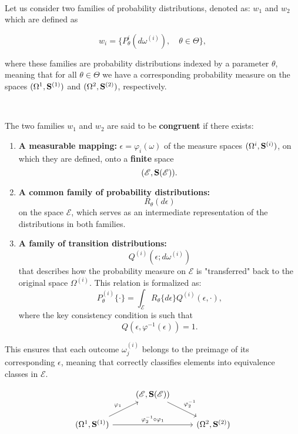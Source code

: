 \, 
\begin{theorem}\label{T:Univ}
Let us consider two families of probability distributions, denoted as: $ w_1$ and $w_2$ which are defined as

\[w_i=\{P_{\theta}^{{i}}(d\omega^{(i)}), \quad \theta\in \Theta\},\] 

where these families are probability distributions indexed by a parameter $\theta$, meaning that for all $\theta\in \Theta$ we have a corresponding probability measure on the spaces $(\Omega^{1},{\bf S}^{(1)})$ and $(\Omega^{2},{\bf S}^{(2)})$, respectively.

\, 

The two families $w_1$ and $w_2$ are said to be {\bf congruent} if there exists:

\begin{enumerate}
    \item {\bf A measurable mapping:}
$\epsilon=\varphi_{i}(\omega)$ of the measure spaces $(\Omega^{i},{\bf S}^{(i)})$, on which they are defined, onto a {\bf finite} space \[(\mathscr{E},{\bf S}(\mathscr{E})).\]

\item {\bf A common family of probability distributions:}
    \[R_{\theta}(d\epsilon)\] on the space $\mathscr{E}$, which serves as an intermediate representation of the distributions in both families.
    \item {\bf A family of transition distributions:}
     $$Q^{(i)}(\epsilon;d\omega^{(i)})$$
that describes how the probability measure on $\mathscr{E}$ is "transferred" back to the original space $\Omega^{(i)}$.
This relation is formalized as: 
\[P^{(i)}_{\theta}\{\cdot\}=\int_{\mathscr{E}}R_{\theta}\{d\epsilon\}Q^{(i)}(\epsilon,\cdot),\] where the key consistency condition is such that \[ Q(\epsilon,\varphi^{-1}(\epsilon))=1.\]
\end{enumerate}
This ensures that each outcome 
$\omega^{(i)}_{j}$ belongs to the preimage of its corresponding 
$\epsilon$, meaning that 
correctly classifies elements into equivalence classes in 
$\mathscr{E}$.

\[
\begin{tikzcd}
{} & (\mathscr{E},{\bf S}(\mathscr{E})) \arrow{dr}{\varphi^{-1}_2} \\
(\Omega^{1},{\bf S}^{(1)}) \arrow{ur}{\varphi_1} \arrow{rr}{\varphi^{-1}_2\circ \varphi_1} && (\Omega^{2},{\bf S}^{(2)})
\end{tikzcd}
\]
\end{theorem}


